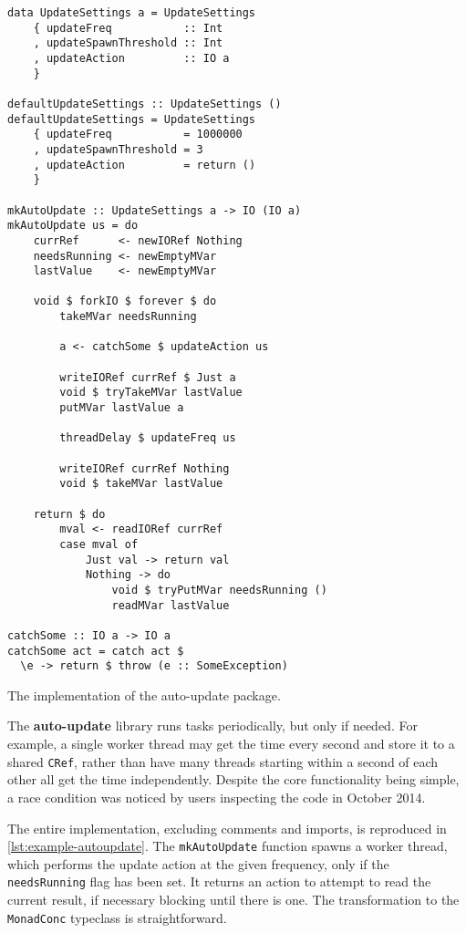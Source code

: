 \begin{listing}
  \begin{verbatim}
data UpdateSettings a = UpdateSettings
    { updateFreq           :: Int
    , updateSpawnThreshold :: Int
    , updateAction         :: IO a
    }

defaultUpdateSettings :: UpdateSettings ()
defaultUpdateSettings = UpdateSettings
    { updateFreq           = 1000000
    , updateSpawnThreshold = 3
    , updateAction         = return ()
    }

mkAutoUpdate :: UpdateSettings a -> IO (IO a)
mkAutoUpdate us = do
    currRef      <- newIORef Nothing
    needsRunning <- newEmptyMVar
    lastValue    <- newEmptyMVar

    void $ forkIO $ forever $ do
        takeMVar needsRunning

        a <- catchSome $ updateAction us

        writeIORef currRef $ Just a
        void $ tryTakeMVar lastValue
        putMVar lastValue a

        threadDelay $ updateFreq us

        writeIORef currRef Nothing
        void $ takeMVar lastValue

    return $ do
        mval <- readIORef currRef
        case mval of
            Just val -> return val
            Nothing -> do
                void $ tryPutMVar needsRunning ()
                readMVar lastValue

catchSome :: IO a -> IO a
catchSome act = catch act $
  \e -> return $ throw (e :: SomeException)
  \end{verbatim}
  \caption{The implementation of the auto-update package.}\label{lst:example-autoupdate}
\end{listing}

The \textbf{auto-update} library runs tasks periodically, but only if
needed.  For example, a single worker thread may get the time every
second and store it to a shared \verb|CRef|, rather than have many
threads starting within a second of each other all get the time
independently.  Despite the core functionality being simple, a race
condition was noticed by users inspecting the code in October 2014.

The entire implementation, excluding comments and imports, is
reproduced in \cref{lst:example-autoupdate}.  The \verb|mkAutoUpdate|
function spawns a worker thread, which performs the update action at
the given frequency, only if the \verb|needsRunning| flag has been
set.  It returns an action to attempt to read the current result, if
necessary blocking until there is one.  The transformation to the
\verb|MonadConc| typeclass is straightforward.

